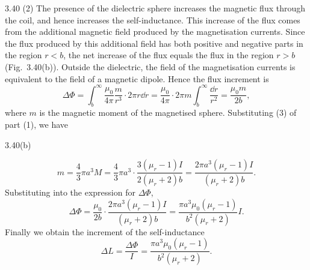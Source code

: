 \begin{solution}{3.40}
(2) The presence of the dielectric sphere increases the magnetic flux through the coil, and hence increases the self-inductance. This increase of the flux comes from the additional magnetic field produced by the magnetisation currents. Since the flux produced by this additional field has both positive and negative parts in the region $r<b$, the net increase of the flux equals the flux in the region $r>b$ (Fig.~3.40(b)). Outside the dielectric, the field of the magnetisation currents is equivalent to the field of a magnetic dipole. Hence the flux increment is
\[
\Delta\Phi=\int_b^\infty\frac{\mu_0}{4\pi}\frac{m}{r^3}\cdot2\pi r\dd r
=\frac{\mu_0}{4\pi}\cdot2\pi m\int_b^\infty\frac{\dd r}{r^2}
=\frac{\mu_0m}{2b},
\]
where $m$ is the magnetic moment of the magnetised sphere. Substituting (3) of part (1), we have

\begin{figbox}{3.40(b)}
\end{figbox}

\[
m=\frac{4}{3}\pi a^3M=\frac{4}{3}\pi a^3\cdot\frac{3(\mu_r-1)I}{2(\mu_r+2)b}
=\frac{2\pi a^3(\mu_r-1)I}{(\mu_r+2)b}.
\]
Substituting into the expression for $\Delta\Phi$,
\[
\Delta\Phi=\frac{\mu_0}{2b}\cdot\frac{2\pi a^3(\mu_r-1)I}{(\mu_r+2)b}
=\frac{\pi a^3\mu_0(\mu_r-1)}{b^2(\mu_r+2)}I .
\]
Finally we obtain the increment of the self-inductance
\[
\Delta L=\frac{\Delta\Phi}{I}=\frac{\pi a^3\mu_0(\mu_r-1)}{b^2(\mu_r+2)}.
\]
\end{solution}

